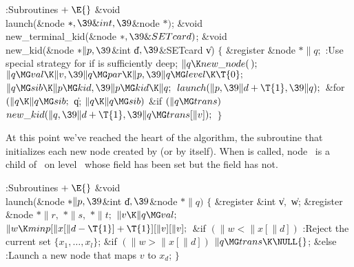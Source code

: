 \Y\B\4:Subroutines\X${}\mathrel+\E{}$\6
\&{void} \\{launch}(\&{node} ${}{*},\39\&{int},\39{}$\&{node} ${}{*}){}$;\6
\&{void} \\{new\_terminal\_kid}(\&{node} ${}{*},\39\&{SETcard}){}$;\7
\&{void} \\{new\_kid}(\&{node} ${}{*}\|p,\39{}$\&{int} \|d${},\39{}$\&{SETcard}
\|v)\1\1\2\2\6
${}\{{}$\1\6
\&{register} \&{node} ${}{*}\|q;{}$\7
:Use special strategy for  if  is sufficiently
deep\X;\6
${}\|q\K\\{new\_node}(\,);{}$\6
${}\|q\MG\\{val}\K\|v,\39\|q\MG\\{par}\K\|p,\39\|q\MG\\{level}\K\T{0};{}$\6
${}\|q\MG\\{sib}\K\|p\MG\\{kid},\39\|p\MG\\{kid}\K\|q;{}$\6
${}\\{launch}(\|p,\39\|d+\T{1},\39\|q);{}$\6
\&{for} ${}(\|q\K\|q\MG\\{sib};{}$ \|q; ${}\|q\K\|q\MG\\{sib}){}$\1\6
\&{if} ${}(\|q\MG\\{trans}){}$\1\5
${}\\{new\_kid}(\|q,\39\|d+\T{1},\39\|q\MG\\{trans}[\|v]);{}$\2\2\6
\4${}\}{}$\2\par
\fi

At this point we've reached the heart of the algorithm,
the 
subroutine that initializes each new node created by  (or by
 itself). When  is called, node~%
 is a child of~
on level~ whose  field has been set but the 
field has not.

\Y\B\4:Subroutines\X${}\mathrel+\E{}$\6
\&{void} \\{launch}(\&{node} ${}{*}\|p,\39{}$\&{int} \|d${},\39{}$\&{node}
${}{*}\|q){}$\1\1\2\2\6
${}\{{}$\1\6
\&{register} \&{int} \|v${},{}$ \|w;\6
\&{register} \&{node} ${}{*}\|r,{}$ ${}{*}\|s,{}$ ${}{*}\|t;{}$\7
${}\|v\K\|q\MG\\{val};{}$\6
${}\|w\K\\{minp}[\|x[\|d-\T{1}]+\T{1}][\|v][\|v];{}$\6
\&{if} ${}(\|w<\|x[\|d]){}$\1\5
:Reject the current set $\{x_1,\ldots,x_l\}$\X;\2\6
\&{if} ${}(\|w>\|x[\|d]){}$\1\5
${}\|q\MG\\{trans}\K\NULL{}$;\2\6
\&{else}\1\5
:Launch a new node that maps $v$ to $x_d$\X;\2\6
\4${}\}{}$\2\par
\fi

